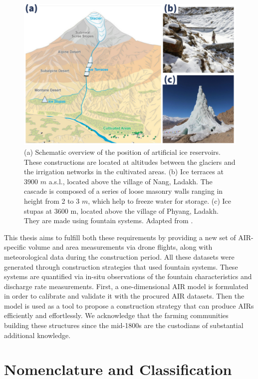 \begin{figure}[t]
\centering
\includegraphics[width=\textwidth]{figs/AIR_forms.jpg}

\caption{ (a) Schematic overview of the position of artificial ice reservoirs. These constructions are located at
  altitudes between the glaciers and the irrigation networks in the cultivated areas. (b) Ice terraces at 3900
  $m$ \ac{a.s.l.}, located above the village of Nang, Ladakh. The cascade is composed of a series of loose masonry walls
  ranging in height from 2 to 3 $m$, which help to freeze water for storage. (c) Ice stupas at 3600 m, located
above the village of Phyang, Ladakh. They are made using fountain systems. Adapted from \cite{nusserLocalKnowledgeGlobal2016}. }

\label{fig:AIRforms}
\end{figure}

This thesis aims to fulfill both these requirements by providing a new set of AIR-specific volume and area
measurements via drone flights, along with meteorological data during the construction period. All these
datasets were generated through construction strategies that used fountain systems. These systems are quantified
via in-situ observations of the fountain characteristics and discharge rate measurements. First, a
one-dimensional AIR model is formulated in order to calibrate and validate it with the procured AIR datasets.
Then the model is used as a tool to propose a construction strategy that can produce \ac{AIRs} efficiently and
effortlessly. We acknowledge that the farming communities building these structures since the mid-1800s are the
custodians of substantial additional knowledge.


\section{Nomenclature and Classification}

